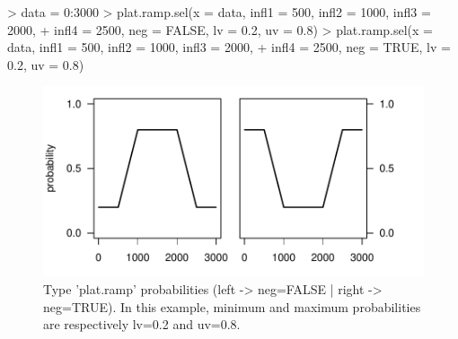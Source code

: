 \documentclass[letterpaper, 12pt]{article}
\begin{document}
\begin{Schunk}
\begin{Sinput}
> data = 0:3000
> plat.ramp.sel(x = data, infl1 = 500, infl2 = 1000, infl3 = 2000, 
+     infl4 = 2500, neg = FALSE, lv = 0.2, uv = 0.8)
> plat.ramp.sel(x = data, infl1 = 500, infl2 = 1000, infl3 = 2000, 
+     infl4 = 2500, neg = TRUE, lv = 0.2, uv = 0.8)
\end{Sinput}
\end{Schunk}
\begin{figure}[h]
\vspace{-20pt}
\begin{center}
\includegraphics{relation_sel-021}
\end{center}
\vspace{-30pt}
\caption{Type 'plat.ramp' probabilities (left -> neg=FALSE |  right -> neg=TRUE). In this example, minimum and maximum probabilities are respectively lv=0.2 and uv=0.8.}
\vspace{-20pt}
\label{fig10}
\end{figure}
\end{document}
